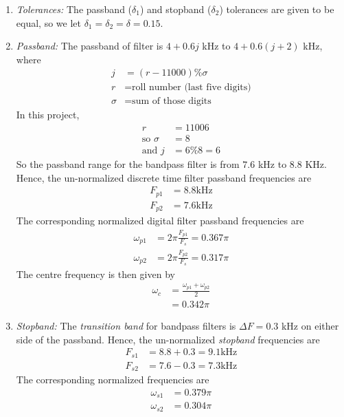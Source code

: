 \documentclass{article}
\begin{document}
\begin{enumerate}
\item {\em Tolerances:}  The passband ($\delta_1$) and stopband ($\delta_2$) tolerances are given to
be equal, so we let $\delta_1 = \delta_2 = \delta = 0.15$.
\item {\em Passband:}  The passband of filter is $4+0.6j$ kHz to $4+0.6(j+2)$ kHz, where 
\begin{align}
    j &= (r-11000)\%\sigma \\
    r &= \text{roll number (last five digits)} \\
    \sigma &= \text{sum of those digits}
\end{align}
In this project,
\begin{align}
    r &= 11006 \\
 \text{so }   \sigma &= 8 \\
  \text{and }  j &= 6 \% 8 = 6
\end{align}
So the passband range for the bandpass filter is from $7.6$ kHz to $8.8$ KHz. Hence, the un-normalized discrete time filter passband frequencies are 
\begin{align}
    F_{p1} &= 8.8 \text{kHz} \\
    F_{p2} &= 7.6 \text{kHz}
\end{align}
The corresponding normalized digital filter passband frequencies are 
\begin{align}
    \omega_{p1} &= 2\pi\frac{F_{p1}}{F_s}  = 0.367\pi \\
    \omega_{p2} &= 2\pi\frac{F_{p2}}{F_s}  = 0.317 \pi
\end{align}
The centre frequency is then given by  
\begin{align}
    \omega_c &= \frac{\omega_{p1} + \omega_{p2}}{2} \\
             &= 0.342\pi
\end{align}
\item {\em Stopband:}  The {\em transition band} for bandpass filters is $\Delta F = 0.3$ kHz on either side of the passband.
Hence, the un-normalized {\em stopband} frequencies are 
\begin{align}
    F_{s1} &= 8.8 + 0.3 = 9.1 \text{kHz} \\
    F_{s2} &= 7.6 - 0.3 = 7.3 \text{kHz}
\end{align}
The corresponding normalized frequencies are 
\begin{align}
    \omega_{s1} &= 0.379 \pi \\
    \omega_{s2} &=  0.304 \pi
\end{align}
\end{enumerate}
\end{document}
